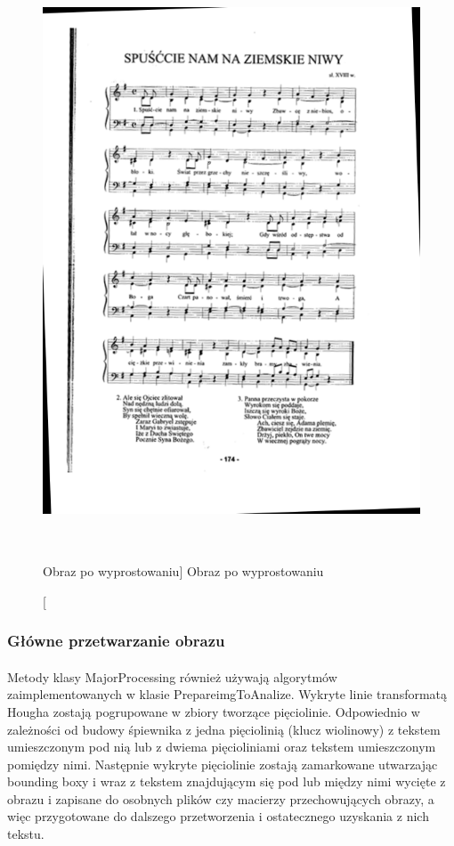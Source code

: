\documentclass[a4paper,12pt]{article}
\begin{document}
                \begin{figure}[!ht]  
        		    \begin{center}
        			    \includegraphics[height=17cm, frame] {image//exampleImage//003_b.png} 
        		    \end{center}
        			\caption
            			[Obraz po wyprostowaniu]  
            			{Obraz po wyprostowaniu}  
        	    \end{figure} 
		
		        \newpage 
		 
	    \subsubsection{Główne przetwarzanie obrazu}
		    \paragraph{} Metody klasy MajorProcessing również używają algorytmów zaimplementowanych     w klasie PrepareimgToAnalize. Wykryte linie transformatą Hougha zostają     pogrupowane w zbiory tworzące pięciolinie. Odpowiednio w zależności od      budowy śpiewnika z jedna pięciolinią (klucz wiolinowy) z tekstem            umieszczonym pod nią lub z dwiema pięcioliniami oraz tekstem umieszczonym     pomiędzy nimi. Następnie wykryte pięciolinie zostają zamarkowane             utwarzając bounding boxy i wraz z tekstem znajdującym się pod lub między     nimi wycięte z obrazu i zapisane do osobnych plików czy macierzy            przechowujących obrazy, a więc przygotowane do dalszego przetworzenia i     ostatecznego uzyskania z nich tekstu.
		
\end{document}
